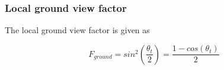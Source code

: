 \subsubsection{Local ground view factor}
The local ground view factor is given as \cite{neryterrain}

\begin{equation}
F_{ground}=sin^2 \left ( \frac{\theta_t}{2}\right )=\frac{1-cos(\theta_t)}{2}
\end{equation}


